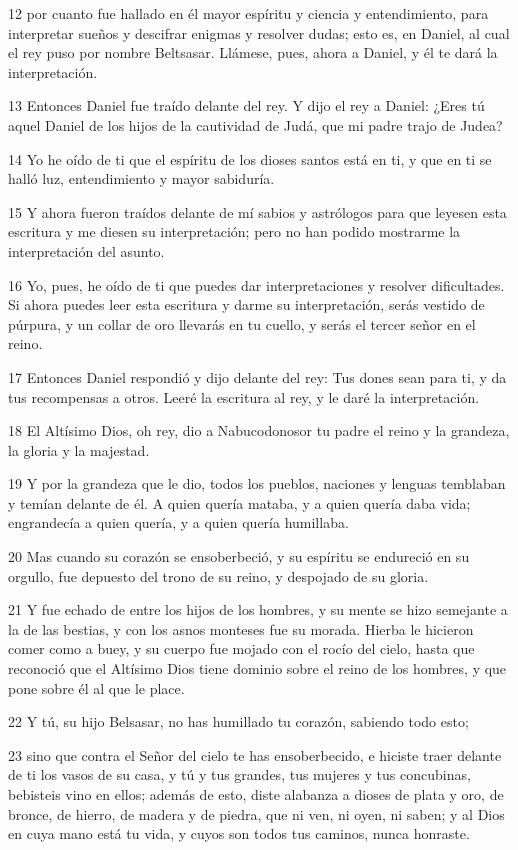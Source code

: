 \par 12 por cuanto fue hallado en él mayor espíritu y ciencia y entendimiento, para interpretar sueños y descifrar enigmas y resolver dudas; esto es, en Daniel, al cual el rey puso por nombre Beltsasar. Llámese, pues, ahora a Daniel, y él te dará la interpretación.
\par 13 Entonces Daniel fue traído delante del rey. Y dijo el rey a Daniel: ¿Eres tú aquel Daniel de los hijos de la cautividad de Judá, que mi padre trajo de Judea?
\par 14 Yo he oído de ti que el espíritu de los dioses santos está en ti, y que en ti se halló luz, entendimiento y mayor sabiduría.
\par 15 Y ahora fueron traídos delante de mí sabios y astrólogos para que leyesen esta escritura y me diesen su interpretación; pero no han podido mostrarme la interpretación del asunto.
\par 16 Yo, pues, he oído de ti que puedes dar interpretaciones y resolver dificultades. Si ahora puedes leer esta escritura y darme su interpretación, serás vestido de púrpura, y un collar de oro llevarás en tu cuello, y serás el tercer señor en el reino.
\par 17 Entonces Daniel respondió y dijo delante del rey: Tus dones sean para ti, y da tus recompensas a otros. Leeré la escritura al rey, y le daré la interpretación.
\par 18 El Altísimo Dios, oh rey, dio a Nabucodonosor tu padre el reino y la grandeza, la gloria y la majestad.
\par 19 Y por la grandeza que le dio, todos los pueblos, naciones y lenguas temblaban y temían delante de él. A quien quería mataba, y a quien quería daba vida; engrandecía a quien quería, y a quien quería humillaba.
\par 20 Mas cuando su corazón se ensoberbeció, y su espíritu se endureció en su orgullo, fue depuesto del trono de su reino, y despojado de su gloria.
\par 21 Y fue echado de entre los hijos de los hombres, y su mente se hizo semejante a la de las bestias, y con los asnos monteses fue su morada. Hierba le hicieron comer como a buey, y su cuerpo fue mojado con el rocío del cielo, hasta que reconoció que el Altísimo Dios tiene dominio sobre el reino de los hombres, y que pone sobre él al que le place.
\par 22 Y tú, su hijo Belsasar, no has humillado tu corazón, sabiendo todo esto;
\par 23 sino que contra el Señor del cielo te has ensoberbecido, e hiciste traer delante de ti los vasos de su casa, y tú y tus grandes, tus mujeres y tus concubinas, bebisteis vino en ellos; además de esto, diste alabanza a dioses de plata y oro, de bronce, de hierro, de madera y de piedra, que ni ven, ni oyen, ni saben; y al Dios en cuya mano está tu vida, y cuyos son todos tus caminos, nunca honraste.
